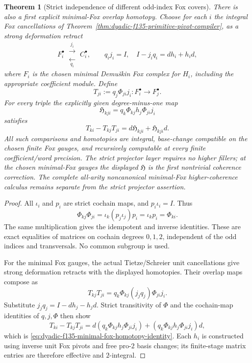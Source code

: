 \documentclass[11pt]{article}
\newtheorem{theorem}{Theorem}[section]
\theoremstyle{definition}
\begin{document}
\begin{theorem}[Strict independence of different odd-index Fox covers]
There is also a
first explicit
\emph{minimal-Fox
overlap homotopy}.
Choose for each
$i$ the integral
Fox cancellations of
Theorem~\ref{thm:dyadic-f135-primitive-pivot-compiler},
as a strong
deformation
retract
\[
F_i^\bullet
\ \substack{\xrightarrow{\ j_i\ }\\[-1ex]
\xleftarrow[\ q_i\ ]{}}\ 
C_i^\bullet,
\qquad
q_i j_i=I,\quad
I-j_iq_i=d h_i+h_i d,
\]
where $F_i$ is the
chosen minimal
Demu\v{s}kin
Fox complex
for $H_i$,
including the
appropriate
coefficient module.
Define
\begin{equation}\label{eq:dyadic-f135-minimal-fox-overlap-maps}
T_{ji}:=q_j\Phi_{ji}j_i:
F_i^\bullet\longrightarrow F_j^\bullet.
\end{equation}
For every triple
the explicitly
given degree-minus-one
map
\begin{equation}\label{eq:dyadic-f135-first-fox-overlap-homotopy}
\boxed{\quad
\mathfrak H_{kji}
=q_k\Phi_{kj}h_j\Phi_{ji}j_i
\quad}
\end{equation}
satisfies
\begin{equation}\label{eq:dyadic-f135-minimal-fox-homotopy-identity}
\boxed{\quad
T_{ki}-T_{kj}T_{ji}
=d\mathfrak H_{kji}
+\mathfrak H_{kji}d.
\quad}
\end{equation}
All such
comparisons and
homotopies are
integral,
base-change
compatible on
the chosen
finite Fox gauges,
and recursively
computable at
every finite
coefficient/word
precision.
The strict
projector layer
requires \emph{no}
higher fillers;
at the chosen
minimal-Fox
gauges the
displayed $\mathfrak H$
is the first
nontrivial
coherence correction.
The complete
all-arity
noncanonical
minimal-Fox
higher-coherence
calculus remains
separate from
the strict
projector assertion.
\end{theorem}

\begin{proof}
All $\iota_i$
and $p_i$
are strict
cochain maps,
and $p_i\iota_i=I$.
Thus
\[
\Phi_{kj}\Phi_{ji}
=\iota_k(p_j\iota_j)p_i
=\iota_kp_i=\Phi_{ki}.
\]
The same
multiplication
gives the
idempotent and
inverse
identities.
These are
exact equalities
of matrices
on cochain
degrees $0,1,2$,
independent of
the odd indices
and transversals.
No common
subgroup is used.

For the minimal
Fox gauges,
the actual
Tietze/Schreier
unit cancellations
give strong
deformation
retracts with
the displayed
homotopies.
Their overlap
maps compose as
\[
T_{kj}T_{ji}
=q_k\Phi_{kj}
(j_jq_j)\Phi_{ji}j_i.
\]
Substitute
$j_jq_j=I-dh_j-h_jd$.
Strict
transitivity of
$\Phi$ and
the cochain-map
identities of
$q,j,\Phi$
then show
\[
T_{ki}-T_{kj}T_{ji}
=d(q_k\Phi_{kj}h_j\Phi_{ji}j_i)
+(q_k\Phi_{kj}h_j\Phi_{ji}j_i)d,
\]
which is
\eqref{eq:dyadic-f135-minimal-fox-homotopy-identity}.
Each $h_i$
is constructed
using inverse
unit Fox pivots
and free
pro-$2$ basis
changes;
its finite-stage
matrix entries
are therefore
effective and
$2$-integral.
\end{proof}
\end{document}
